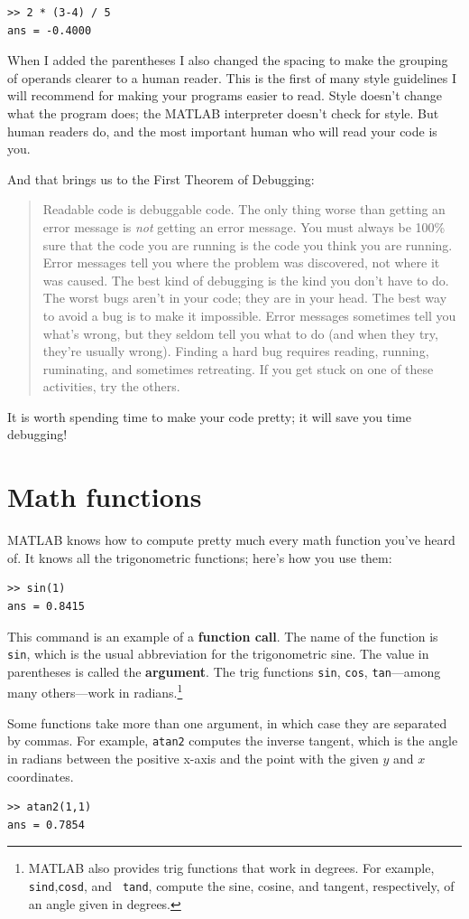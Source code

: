 \documentclass[
]{book}
\newcommand{\displaythrm}[1]{%
    \ifthenelse{\equal{#1}{1}}%
        {Readable code is debuggable code.}{%
    \ifthenelse{\equal{#1}{2}}%
        {The only thing worse than getting an error message is {\em
         not} getting an error message.}{%
    \ifthenelse{\equal{#1}{3}}%
        {You must always be 100\% sure that the code you are running
         is the code you think you are running.}{%
    \ifthenelse{\equal{#1}{4}}%
        {Error messages tell you where the problem was discovered,
         not where it was caused.}{%
    \ifthenelse{\equal{#1}{5}}%
        {The best kind of debugging is the kind you don't have to do.}{%
    \ifthenelse{\equal{#1}{6}}%
        {The worst bugs aren't in your code; they are in your head.}{%
    \ifthenelse{\equal{#1}{7}}%
        {The best way to avoid a bug is to make it impossible.}{%
    \ifthenelse{\equal{#1}{8}}%
        {Error messages sometimes tell you what's wrong, but they
         seldom tell you what to do (and when they try, they're usually
         wrong).}{%
    \ifthenelse{\equal{#1}{9}}%
        {Finding a hard bug requires reading, running, ruminating,
         and sometimes retreating.  If you get stuck on one of these
         activities, try the others.}{%
    {}%
}}}}}}}}}}%
\begin{document}
\begin{verbatim}
>> 2 * (3-4) / 5
ans = -0.4000
\end{verbatim}

When I added the parentheses I also changed the spacing to make the
grouping of operands clearer to a human reader.  This is the first
of many style guidelines I will recommend for making your programs
easier to read.  Style doesn't change what the program does; the MATLAB
interpreter doesn't check for style.  But human readers do, and the
most important human who will read your code is you.

And that brings us to the First Theorem of Debugging:

\begin{quote}
\displaythrm{1}
\end{quote}

It is worth spending time to make your code pretty; it will save
you time debugging!


\section{Math functions}

MATLAB knows how to compute pretty much every math function you've
heard of.  It knows all the trigonometric functions; here's how you
use them:

\begin{verbatim}
>> sin(1)
ans = 0.8415
\end{verbatim}

This command is an example of a {\bf function call}.  The name of the
function is {\tt sin}, which is the usual abbreviation for the
trigonometric sine.  The value in parentheses is called the {\bf argument}.
The trig functions {\tt sin}, {\tt cos}, {\tt tan}---among many
others---work in radians.\footnote{MATLAB also provides trig functions
that work in degrees. For example, {\tt sind},{\tt cosd}, and {\tt
tand}, compute the sine, cosine, and tangent, respectively, of an angle given in
degrees.}

Some functions take more than one argument, in which case they are
separated by commas.  For example, {\tt atan2} computes the inverse
tangent, which is the angle in radians between the positive x-axis and
the point with the given $y$ and $x$ coordinates.

\begin{verbatim}
>> atan2(1,1)
ans = 0.7854
\end{verbatim}
\end{document}
